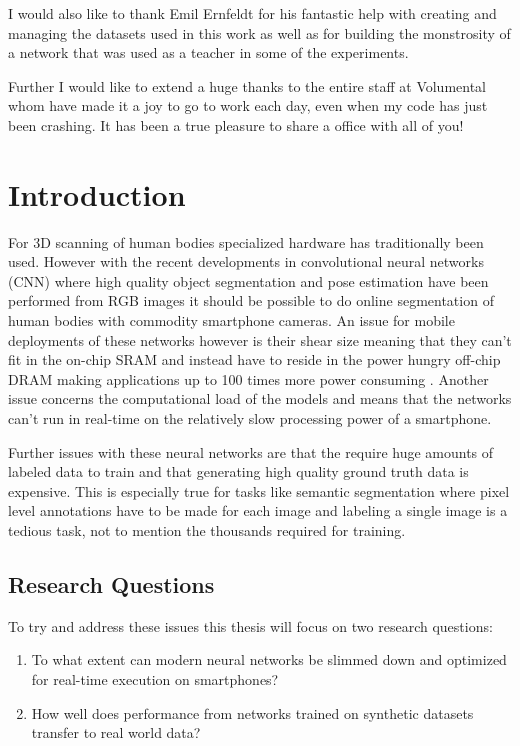 \documentclass{kththesis}
\begin{document}
I would also like to thank Emil Ernfeldt for his fantastic help with creating and
managing the datasets used in this work as well as for building the monstrosity
of a network that was used as a teacher in some of the experiments.

Further I would like to extend a huge thanks to the entire staff at Volumental whom have made it a joy to go to work
each day, even when my code has just been crashing. It has been a true pleasure to share a office with all of you!


\tableofcontents


\mainmatter


\chapter{Introduction}
For 3D scanning of human bodies specialized hardware has traditionally been
used. However with the recent developments in convolutional neural networks
(CNN) where high quality object segmentation \parencite{BriefHistory} and pose
estimation \parencite{he2017mask} have been performed from RGB images it should
be possible to do online segmentation of human bodies with commodity smartphone cameras. An issue
for mobile deployments of these networks however is their shear size meaning
that they can't fit in the on-chip SRAM and instead have to reside in the power
hungry off-chip DRAM making applications up to 100 times more power consuming
\parencite{han2015learning}. Another issue concerns the computational load of
the models and means that the networks can't run in real-time on the relatively
slow processing power of a smartphone. 

Further issues with these neural networks are that the require huge amounts of
labeled data to train and that generating high quality ground truth data is
expensive. This is especially true for tasks like semantic segmentation
where pixel level annotations have to be made for each image and labeling a
single image is a tedious task, not to mention the thousands required for
training. 

\section{Research Questions}
To try and address these issues this thesis will focus on two research questions:
\begin{enumerate}
\item To what extent can modern neural networks be slimmed down and optimized for
  real-time execution on smartphones?
\item How well does performance from networks trained on synthetic datasets
  transfer to real world data? 
\end{enumerate}
  
\end{document}
